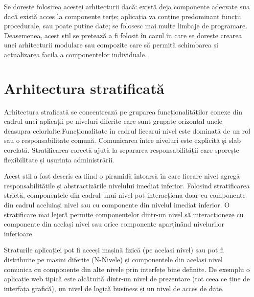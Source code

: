 \documentclass[12pt, a4paper, oneside, romanian]{teza-upb}
\begin{document}
Se dorește folosirea acestei arhitecturii dacă: există deja componente adecvate sua dacă există acces la componente terțe; aplicația va conține predominant funcții procedurale, sau poate puține date; se folosesc mai multe limbaje de programare. Deasemenea, acest stil se pretează a fi folosit în cazul în care se dorește crearea unei arhitecturii modulare sau compozite care să permită schimbarea și actualizarea facila a componentelor individuale.

\section{Arhitectura stratificată}

Arhitectura straficată se concentrează pe gruparea funcționalităților conexe din cadrul unei aplicații pe niveluri diferite care sunt grupate orizontal unele deasupra celorlalte.Funcționalitate în cadrul fiecarui nivel este dominată de un rol sau o responsabilitate comună. Comunicarea între niveluri este explicită și slab corelată. Stratificarea corectă ajută la separarea responsabilității care sporește flexibilitate și ușurința administrării.

Acest stil a fost descris ca fiind o piramidă întoarsă în care fiecare nivel agregă responsabilitățile și abstractizările nivelului imediat inferior. Folosind stratificarea strictă, componentele din cadrul unui nivel pot interacționa doar cu componente din cadrul aceluiași nivel sau cu componente din nivelul imediat inferior. O stratificare mai lejeră permite componentelor dintr-un nivel să interacționeze cu componente din același nivel sau orice componente aparținând nivelurilor inferioare.

Straturile aplicației pot fi aceeși mașină fizică (pe acelasi nivel) sau pot fi distribuite pe masini diferite (N-Nivele) și componentele din același nivel comunica cu componente din alte nivele prin interfețe bine definite. De exemplu o aplicație web tipică este alcătuită dintr-un nivel de prezentare (tot ceea ce ține de interfața grafică), un nivel de logică business și un nivel de acces de date. 
\end{document}
